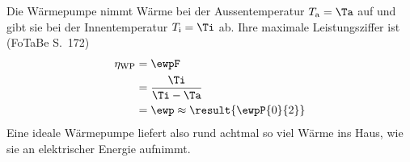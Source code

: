 Die Wärmepumpe nimmt Wärme bei der Aussentemperatur $T_\text{a} = \Ta$ auf und gibt sie bei der Innentemperatur $T_\text{i} = \Ti$ ab. Ihre maximale Leistungsziffer ist (FoTaBe S.~172)
\begin{align}
 \eta_\text{WP} &= \ewpF \\
   &= \frac{\Ti}{\Ti-\Ta} \\
   &= \ewp \approx \result{\ewpP{0}{2}}
\end{align}
Eine ideale Wärmepumpe liefert also rund achtmal so viel Wärme ins Haus, wie sie an elektrischer Energie aufnimmt.
